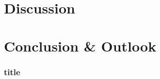 \documentclass[12pt]{scrartcl}
\begin{document}
	\newpage
	\section{Discussion}

	\newpage
	\section{Conclusion \& Outlook}
		\subsubsection{title}



	\newpage
	
	
\end{document}
